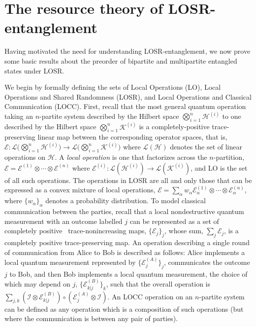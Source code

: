 \documentclass[12pt]{article}
\theoremstyle{plain}
\theoremstyle{definition}
\begin{document}
\section{The resource theory of LOSR-entanglement}\label{sec:RTLOSR}


Having motivated the need for understanding LOSR-entanglement, we now prove some basic results about the preorder of bipartite and multipartite entangled states under LOSR. 

We begin by formally defining the sets of Local Operations (LO), Local Operations and Shared Randomness (LOSR), and Local Operations and Classical Communication (LOCC).
First, recall that the most general quantum operation taking an $n$-partite system described by the Hilbert space $\bigotimes_{i=1}^{n} \mathcal{H}^{(i)}$ to one described by the Hilbert space $\bigotimes_{i=1}^{n} \mathcal{K}^{(i)}$ is a completely-positive trace-preserving linear map between the corresponding operator spaces, that is, $\mathcal{E}: \mathcal{L}\big( \bigotimes_{i=1}^{n} \mathcal{H}^{(i)}\big) \to  \mathcal{L}\big( \bigotimes_{i=1}^{n} \mathcal{K}^{(i)}\big)$ where $\mathcal{L}(\mathcal{H})$ denotes the set of linear operations on  $\mathcal{H}$. 
A {\em local operation} is one that factorizes across the $n$-partition, 
$\mathcal{E}=
\mathcal{E}^{(1)}\otimes \cdots \otimes \mathcal{E}^{(n)}$
 where  $\mathcal{E}^{(i)} :  \mathcal{L}(\mathcal{H}^{(i)}) \to \mathcal{L}(\mathcal{K}^{(i)})$, and LO is the set of all such operations.  The operations in LOSR  are all and only those that can be expressed as a convex mixture of local operations, $\mathcal{E}=\sum_{\alpha} w_{\alpha} \mathcal{E}_{\alpha}^{(1)}\otimes \cdots \otimes \mathcal{E}_{\alpha}^{(n)}$,
   where $\{w_{\alpha}\}_{\alpha}$ denotes a probability distribution.  
To model classical communication between the parties, recall that a local nondestructive quantum measurement with an outcome labelled $j$ can be represented as a set of completely positive~\cite{NielsenAndChuang,PhysRevA.100.022112} trace-nonincreasing maps, $\{ \mathcal{E}_j\}_j$, whose sum, $\sum_j  \mathcal{E}_j$,  is a completely positive trace-preserving map.  An operation describing a single round of communication from Alice to Bob is described as follows: Alice implements a local quantum measurement represented by $\{ \mathcal{E}^{(A)}_j\}_j$, communicates the outcome $j$ to Bob, and then Bob implements a local quantum measurement, the choice of which may depend on $j$,  $\{ \mathcal{E}^{(B)}_{k|j}\}_k$, such that the overall operation is $\sum_{j,k} \left(  \mathcal{I} \otimes \mathcal{E}^{(B)}_{k|j} \right) \circ \left( \mathcal{E}^{(A)}_j \otimes \mathcal{I} \right)$.  An LOCC operation on an $n$-partite system can be defined as any operation which is a composition of such operations (but where the communication is between any pair of parties). 
\end{document}
